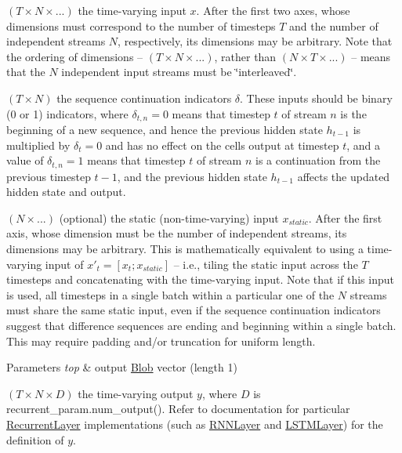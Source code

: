 \begin{DoxyEnumerate}
\item $ (T \times N \times ...) $ the time-\/varying input $ x $. After the first two axes, whose dimensions must correspond to the number of timesteps $ T $ and the number of independent streams $ N $, respectively, its dimensions may be arbitrary. Note that the ordering of dimensions -- $ (T \times N \times ...) $, rather than $ (N \times T \times ...) $ -- means that the $ N $ independent input streams must be \char`\"{}interleaved\char`\"{}.
\item $ (T \times N) $ the sequence continuation indicators $ \delta $. These inputs should be binary (0 or 1) indicators, where $ \delta_{t,n} = 0 $ means that timestep $ t $ of stream $ n $ is the beginning of a new sequence, and hence the previous hidden state $ h_{t-1} $ is multiplied by $ \delta_t = 0 $ and has no effect on the cell\textquotesingle{}s output at timestep $ t $, and a value of $ \delta_{t,n} = 1 $ means that timestep $ t $ of stream $ n $ is a continuation from the previous timestep $ t-1 $, and the previous hidden state $ h_{t-1} $ affects the updated hidden state and output.
\item $ (N \times ...) $ (optional) the static (non-\/time-\/varying) input $ x_{static} $. After the first axis, whose dimension must be the number of independent streams, its dimensions may be arbitrary. This is mathematically equivalent to using a time-\/varying input of $ x'_t = [x_t; x_{static}] $ -- i.\+e., tiling the static input across the $ T $ timesteps and concatenating with the time-\/varying input. Note that if this input is used, all timesteps in a single batch within a particular one of the $ N $ streams must share the same static input, even if the sequence continuation indicators suggest that difference sequences are ending and beginning within a single batch. This may require padding and/or truncation for uniform length.
\end{DoxyEnumerate}


\begin{DoxyParams}{Parameters}
{\em top} & output \mbox{\hyperlink{classcaffe_1_1_blob}{Blob}} vector (length 1)
\begin{DoxyEnumerate}
\item $ (T \times N \times D) $ the time-\/varying output $ y $, where $ D $ is {\ttfamily recurrent\+\_\+param.\+num\+\_\+output()}. Refer to documentation for particular \mbox{\hyperlink{classcaffe_1_1_recurrent_layer}{Recurrent\+Layer}} implementations (such as \mbox{\hyperlink{classcaffe_1_1_r_n_n_layer}{R\+N\+N\+Layer}} and \mbox{\hyperlink{classcaffe_1_1_l_s_t_m_layer}{L\+S\+T\+M\+Layer}}) for the definition of $ y $. 
\end{DoxyEnumerate}\\
\hline
\end{DoxyParams}



